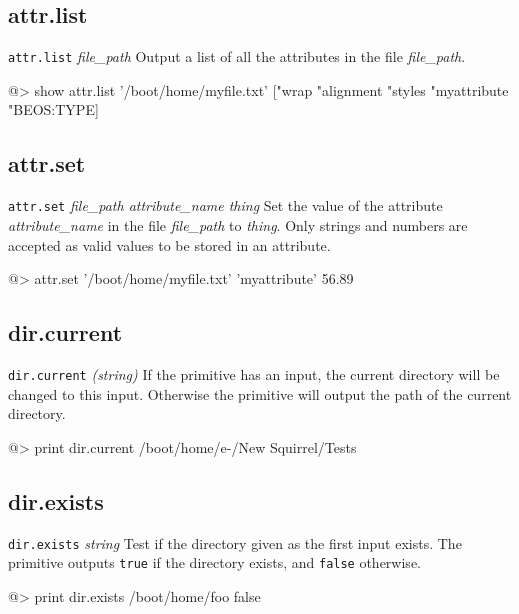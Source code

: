 \subsection*{attr.list} 

{\tt attr.list} {\it file\_path}
\newline\newline
Output a list of all the attributes in the file {\it file\_path}.
\begin{verbatimtab}
@> show attr.list '/boot/home/myfile.txt'
["wrap "alignment "styles "myattribute "BEOS:TYPE]
\end{verbatimtab}

\subsection*{attr.set} 

{\tt attr.set} {\it file\_path attribute\_name thing}
\newline\newline
Set the value of the attribute {\it attribute\_name} in the file {\it file\_path} to {\it thing}. Only strings and numbers are accepted as valid values to be stored in an attribute.
\begin{verbatimtab}
@> attr.set '/boot/home/myfile.txt' 'myattribute' 56.89
\end{verbatimtab}

\subsection*{dir.current} 

{\tt dir.current} {\it (string)}
\newline\newline
If the primitive has an input, the current directory will be changed to this input.  Otherwise the primitive will output the path of the current directory.
\begin{verbatimtab}
@> print dir.current
/boot/home/e-/New Squirrel/Tests
\end{verbatimtab}

\subsection*{dir.exists} 

{\tt dir.exists} {\it string}
\newline\newline
Test if the directory given as the first input exists. The primitive outputs {\tt true} if the directory exists, and {\tt false} otherwise.
\begin{verbatimtab}
@> print dir.exists /boot/home/foo
false
\end{verbatimtab}

